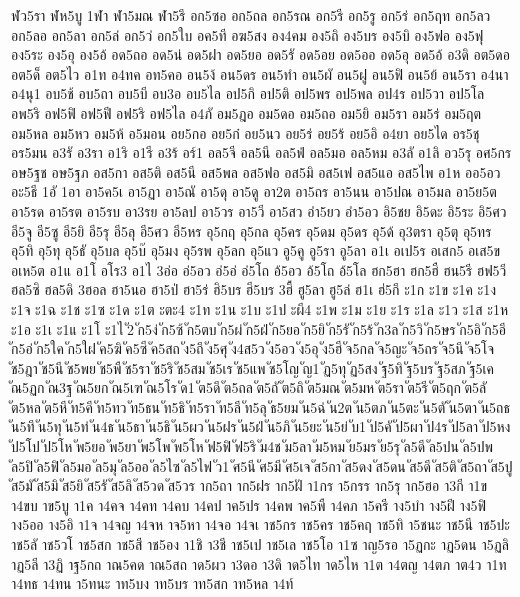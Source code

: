 {ฬว5รา
ฬห5บู
1ฬา
ฬา5มณ
ฬา5รึ
อก5ซอ
อก5ถล
อก5รณ
อก5รี
อก5รู
อก5ร่
อก5ฤท
อก5ลว
อก5ลอ
อก5ลา
อก5ล่
อก5ว่
อก5ใบ
อค5ที
อฆ5สง
อง4คม
อง5ถิ
อง5บร
อง5บิ
อง5ฟอ
อง5ฟุ
อง5ระ
อง5อุ
อง5อ้
อด5ถอ
อด5น่
อด5ฝา
อด5ยอ
อด5รั
อด5อย
อด5ออ
อด5อุ
อด5อ้
อ3ดิ
อต5ดอ
อต5ด็
อต5ไว
อ1ท
อ4ทค
อท5คอ
อน5ง้
อน5ดร
อน5ทำ
อน5ผั
อน5ฝู
อน5ฟิ
อน5ย้
อน5รา
อ4นา
อ4นุ1
อบ5ช้
อบ5ถา
อบ5บี
อบ3อ
อบ5ไล
อป5กิ
อป5ติ
อป5พร
อป5พล
อป4ร
อป5วา
อป5โล
อพ5ริ
อฟ5ฟิ
อฟ5ฟี
อฟ5ริ
อฟ5ไล
อ4ภั
อม5ฎอ
อม5ดอ
อม5ถอ
อม5ยิ
อม5รา
อม5ร่
อม5ฤต
อม5หล
อม5หว
อม5ห้
อ5มอน
อย5กอ
อย5ก๋
อย5นว
อย5ร่
อย5ร้
อย5อิ
อ4ยา
อย5ได
อร5ชุ
อร5มน
อ3รั
อ3รา
อ1ริ
อ1รี
อ3ร้
อร์1
อล5จี
อล5นี
อล5ฟ่
อล5มอ
อล5หม
อ3ลั
อ1ลิ
อว5รุ
อศ5กร
อษ5ฐช
อษ5ฐภ
อส5กา
อส5ติ
อส5นี
อส5พล
อส5ฟอ
อส5มิ
อส5เฟ
อส5แอ
อส5ไพ
อ1ห
ออ5อว
อะ5ธี
1อั
1อา
อา5ค5เ
อา5ฏา
อา5ณั
อา5ดุ
อา5ดู
อา2ต
อา5ถร
อา5นน
อา5ปณ
อา5มล
อา5ย5ต
อา5รด
อา5รต
อา5รบ
อา3รย
อา5ลป
อา5วร
อา5วี
อา5สว
อำ5ยว
อำ5อว
อิ5ชย
อิ5ดะ
อิ5ระ
อิ5ศว
อี5จู
อี5ซู
อี5ยิ
อี5รุ
อี5ลุ
อี5ศว
อี5หร
อุ5กฤ
อุ5กล
อุ5คร
อุ5ดม
อุ5ดร
อุ5ด้
อุ3ตรา
อุ5ตุ
อุ5ทร
อุ5ทิ
อุ5ทุ
อุ5ธั
อุ5บล
อุ5บ๊
อุ5มง
อุ5รพ
อุ5ลก
อุ5แว
อู5คู
อู5รา
อู5ลา
อ1เ
อเป5ร
อเสก5
อเส5ข
อเห5ต
อ1แ
อ1โ
อโร3
อ1ไ
3อ่อ
อ่5อว
อ่5อ่
อ่5โถ
อ้5อว
อ้5โถ
อ้5โล
ฮก5ฮา
ฮก5ฮื
ฮน5รี
ฮฟ5วี
ฮล5ซิ
ฮล5ดิ
3ฮอล
ฮา5นอ
ฮา5ป่
ฮา5ร่
ฮิ5บร
ฮี5บร
3ฮื้
ฮู5ลา
ฮู5ล่
ฮ1เ
ฮ่5กึ
ะ1ก
ะ1ข
ะ1ค
ะ1ง
ะ1จ
ะ1ฉ
ะ1ช
ะ1ซ
ะ1ด
ะ1ต
ะตะ4
ะ1ท
ะ1น
ะ1บ
ะ1ป
ะผี4
ะ1พ
ะ1ม
ะ1ย
ะ1ร
ะ1ล
ะ1ว
ะ1ส
ะ1ห
ะ1อ
ะ1เ
ะ1แ
ะ1โ
ะ1ไ
ั2
ัก5ง่
ัก5ซ้
ัก5ตบ
ัก5ผ่
ัก5ฝ่
ัก5ยอ
ัก5ยิ
ัก5รั
ัก5ร้
ัก3ล
ัก5วิ
ัก5ษร
ัก5อิ
ัก5อี
ัก5อ่
ัก5ใค
ัก5ใฝ
ัค5ฆิ
ัค5ซี
ัค5สถ
ัง5ถึ
ัง5ศุ
ัง4ส5ว
ัง5อว
ัง5อุ
ัง5ฮี
ัจ5กล
ัจ5ญะ
ัจ5ถร
ัจ5นึ
ัจ5โจ
ัช5ฎา
ัช5นี
ัช5พย
ัช5พื
ัช5รา
ัช5ริ
ัช5สม
ัช5เร
ัช5แพ
ัช5โญ
ัญ1
ัฏ5ทุ
ัฏ5สง
ัฐ5ทิ
ัฐ5บร
ัฐ5สภ
ัฐ5เค
ัณ5ฏก
ัณ3ฐ
ัณ5ยก
ัณ5เฑ
ัณ5โร
ัด1
ัต5ดึ
ัต5ถล
ัต5ถั
ัต5ถิ
ัต5มณ
ัต5มห
ัต5รา
ัต5รี
ัต5ฤก
ัต5ลั
ัต5หล
ัต5หี
ัท5คี
ัท5ทว
ัท5ธน
ัท5ธิ
ัท5รา
ัท5ลี
ัท5ลุ
ัธ5ยม
ัน5ฉ่
ัน2ต
ัน5ตภ
ัน5ตะ
ัน5ตั
ัน5ตา
ัน5ถธ
ัน5ทึ
ัน5ทุ
ัน5ท่
ัน4ธ
ัน5ธา
ัน5ธิ
ัน5ผว
ัน5ฝร
ัน5ฝ่
ัน5ภิ
ัน5ยะ
ัน5ย่
ับ1
ัป5คั
ัป5ผา
ัป4ร
ัป5ลา
ัป5หง
ัป5โป
ัป5โห
ัพ5ยอ
ัพ5ยา
ัพ5โพ
ัพ5โห
ัฟ5ฟิ
ัฟ5ริ
ัม4ช
ัม5ลา
ัม5หม
ัย5มร
ัย5รุ
ัล5ดี
ัล5ปน
ัล5ปพ
ัล5ปิ
ัล5ฟิ
ัล5มอ
ัล5มุ
ัล5ออ
ัล5ไซ
ัล5ไฟ
ัว1
ัศ5นี
ัศ5มี
ัศ5เจ
ัส5กา
ัส5ดง
ัส5ดน
ัส5ดี
ัส5ติ
ัส5ถา
ัส5ปู
ัส5มั
ัส5มิ
ัส5ยิ
ัส5รั
ัส5ลิ
ัส5วด
ัส5วร
าก5ถา
าก5ฝร
าก5ฝั
า1กร
า5กรร
าก5รุ
าก5ฮอ
า3กี
า1ข
า4ขบ
าข5บู
า1ค
า4คจ
า4คท
า4คบ
า4คป
าค5ปร
า4คพ
าค5พื
า4คภ
า5ครี
าง5บำ
าง5ฝี
าง5ฟิ
าง5ออ
าง5อิ
า1จ
า4จญ
า4จห
าจ5หา
า4จอ
า4จเ
าช5กร
าช5คร
าช5คฤ
าช5ทิ
า5ชนะ
าช5นี
าช5ปะ
าช5ลั
าช5วโ
าช5สก
าช5สี
าช5อง
า1ชิ
า3ชี
าช5เป
าช5เล
าช5โอ
า1ซ
าญ5รอ
า5ฏกะ
าฏ5ดน
า5ฏลิ
าฏ5ลี
า3ฏิ
าฐ5กถ
าณ5คด
าณ5สถ
าด5ผว
า3ดอ
า3ดิ
าด5ไท
าด5ไห
า1ต
า4ตญ
า4ตภ
าต4ว
า1ท
า4ทธ
า4ทน
า5ทนะ
าท5บง
าท5บร
าท5สก
าท5หล
า4ท์
}
